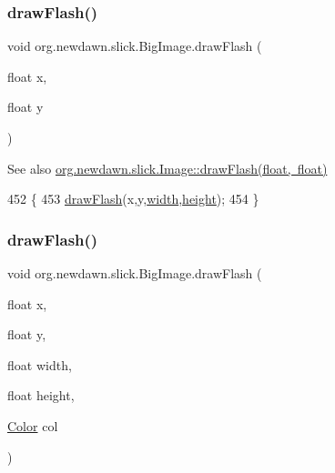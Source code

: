 \mbox{\label{classorg_1_1newdawn_1_1slick_1_1_big_image_a01ecce26c0126c8eb147b766e18f8a89}} 
\subsubsection{\texorpdfstring{draw\+Flash()}{drawFlash()}\hspace{0.1cm}{\footnotesize\ttfamily [2/3]}}
{\footnotesize\ttfamily void org.\+newdawn.\+slick.\+Big\+Image.\+draw\+Flash (\begin{DoxyParamCaption}\item[{float}]{x,  }\item[{float}]{y }\end{DoxyParamCaption})\hspace{0.3cm}{\ttfamily [inline]}}

\begin{DoxySeeAlso}{See also}
\mbox{\hyperlink{classorg_1_1newdawn_1_1slick_1_1_image_a3389eeb9c8b27b7a32dab2f51472475f}{org.\+newdawn.\+slick.\+Image\+::draw\+Flash(float, float)}} 
\end{DoxySeeAlso}

\begin{DoxyCode}
452                                             \{
453         \mbox{\hyperlink{classorg_1_1newdawn_1_1slick_1_1_big_image_ae1a900a9ad455200db7d54ddc10d62fb}{drawFlash}}(x,y,\mbox{\hyperlink{classorg_1_1newdawn_1_1slick_1_1_image_a7d02c85e21b388428cfe5cc5c82714a1}{width}},\mbox{\hyperlink{classorg_1_1newdawn_1_1slick_1_1_image_a54397a37823bc59ddc79ec70dc5cf226}{height}});
454     \}
\end{DoxyCode}
\mbox{\label{classorg_1_1newdawn_1_1slick_1_1_big_image_af3b4c3e296f8e9b43062cac19f22d09e}} 
\subsubsection{\texorpdfstring{draw\+Flash()}{drawFlash()}\hspace{0.1cm}{\footnotesize\ttfamily [3/3]}}
{\footnotesize\ttfamily void org.\+newdawn.\+slick.\+Big\+Image.\+draw\+Flash (\begin{DoxyParamCaption}\item[{float}]{x,  }\item[{float}]{y,  }\item[{float}]{width,  }\item[{float}]{height,  }\item[{\mbox{\hyperlink{classorg_1_1newdawn_1_1slick_1_1_color}{Color}}}]{col }\end{DoxyParamCaption})\hspace{0.3cm}{\ttfamily [inline]}}

